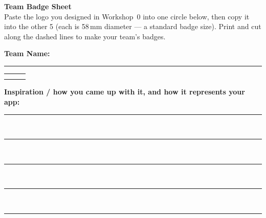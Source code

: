 \documentclass[a4paper,11pt]{article}
\newcommand{\badgecircle}{%
  \begin{tikzpicture}
    \draw[rulecolor, thick, dash pattern=on 3pt off 2pt] (0,0) circle (29mm);
    \node[faint, italic] at (0,0) {\itshape paste logo here};
  \end{tikzpicture}%
}
\begin{document}
{\Huge\bfseries\color{navy}Team Badge Sheet}\\[2mm]
{\color{muted}Paste the logo you designed in Workshop~0 into one circle below, then copy it into the other 5 (each is 58\,mm diameter --- a standard badge size). Print and cut along the dashed lines to make your team's badges.}

\vspace{6mm}
{\bfseries\color{navy}Team Name:} \textcolor{rulecolor}{\rule{100mm}{0.4pt}}

\vspace{8mm}
\begin{center}
\begin{tabular}{@{}ccc@{}}
\badgecircle & \badgecircle & \badgecircle \\[8mm]
\badgecircle & \badgecircle & \badgecircle \\
\end{tabular}
\end{center}

\vspace{10mm}
{\bfseries\color{navy}Inspiration / how you came up with it, and how it represents your app:}\\[4mm]
\textcolor{rulecolor}{\rule{\textwidth}{0.4pt}}\\[8mm]
\textcolor{rulecolor}{\rule{\textwidth}{0.4pt}}\\[8mm]
\textcolor{rulecolor}{\rule{\textwidth}{0.4pt}}\\[8mm]
\textcolor{rulecolor}{\rule{\textwidth}{0.4pt}}\\[8mm]
\textcolor{rulecolor}{\rule{\textwidth}{0.4pt}}
\end{document}
